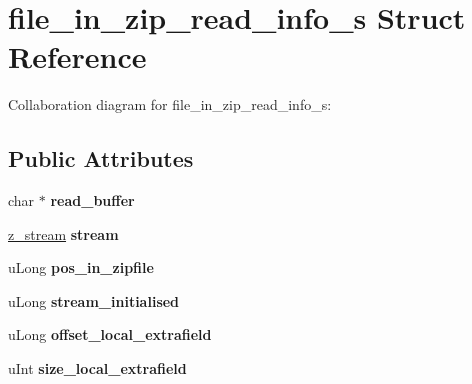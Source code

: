 \hypertarget{structfile__in__zip__read__info__s}{\section{file\+\_\+in\+\_\+zip\+\_\+read\+\_\+info\+\_\+s Struct Reference}
\label{structfile__in__zip__read__info__s}
}


Collaboration diagram for file\+\_\+in\+\_\+zip\+\_\+read\+\_\+info\+\_\+s\+:
\subsection*{Public Attributes}
\begin{DoxyCompactItemize}
\item 
\hypertarget{structfile__in__zip__read__info__s_a6310a19e33ac2cf3280aa74199cbd89b}{char $\ast$ {\bfseries read\+\_\+buffer}}\label{structfile__in__zip__read__info__s_a6310a19e33ac2cf3280aa74199cbd89b}

\item 
\hypertarget{structfile__in__zip__read__info__s_a6973c6240c02a1c8e014d6078bb2bbfc}{\hyperlink{structz__stream__s}{z\+\_\+stream} {\bfseries stream}}\label{structfile__in__zip__read__info__s_a6973c6240c02a1c8e014d6078bb2bbfc}

\item 
\hypertarget{structfile__in__zip__read__info__s_a01d6195d7977bec4db506cdbee9b8a13}{u\+Long {\bfseries pos\+\_\+in\+\_\+zipfile}}\label{structfile__in__zip__read__info__s_a01d6195d7977bec4db506cdbee9b8a13}

\item 
\hypertarget{structfile__in__zip__read__info__s_a8f2d03c24a7b1058288606687eb6d448}{u\+Long {\bfseries stream\+\_\+initialised}}\label{structfile__in__zip__read__info__s_a8f2d03c24a7b1058288606687eb6d448}

\item 
\hypertarget{structfile__in__zip__read__info__s_a8e3a240c367e7d6d199859b1b311128c}{u\+Long {\bfseries offset\+\_\+local\+\_\+extrafield}}\label{structfile__in__zip__read__info__s_a8e3a240c367e7d6d199859b1b311128c}

\item 
\hypertarget{structfile__in__zip__read__info__s_a9abdc9b3f3d500d894a635cc9e956180}{u\+Int {\bfseries size\+\_\+local\+\_\+extrafield}}\label{structfile__in__zip__read__info__s_a9abdc9b3f3d500d894a635cc9e956180}


\end{DoxyCompactItemize}
